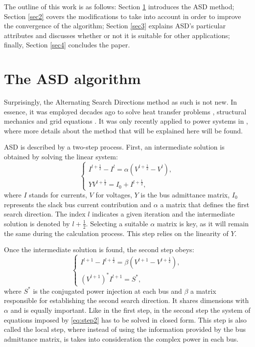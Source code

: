 \documentclass[journal]{IEEEtran}
\begin{document}
The outline of this work is as follows: Section \ref{sec1} introduces the ASD method; Section \ref{sec2} covers the modifications to take into account in order to improve the convergence of the algorithm; Section \ref{sec3} explains ASD's particular attributes and discusses whether or not it is suitable for other applications; finally, Section \ref{sec4} concludes the paper.


\section{The ASD algorithm} \label{sec1}
Surprisingly, the Alternating Search Directions method as such is not new. In essence, it was employed decades ago to solve heat transfer problems \cite{Rimek}, structural mechanics \cite{ladeveze} and grid equations \cite{samarskii}. It was only recently applied to power systems in \cite{asd}, where more details about the method that will be explained here will be found. 

ASD is described by a two-step process. First, an intermediate solution is obtained by solving the linear system:
\begin{equation}
  \begin{cases}
    I^{l+\frac{1}{2}} - I^l = \alpha(V^{l+\frac{1}{2}} - V^l),\\
    YV^{l + \frac{1}{2}} = I_0 + I^{l+\frac{1}{2}},
  \end{cases}
  \label{eq:step1}
\end{equation}
where $I$ stands for currents, $V$ for voltages, $Y$ is the bus admittance matrix, $I_0$ represents the slack bus current contribution and $\alpha$ a matrix that defines the first search direction. The index $l$ indicates a given iteration and the intermediate solution is denoted by $l+\frac{1}{2}$. Selecting a suitable $\alpha$ matrix is key, as it will remain the same during the calculation process. This step relies on the linearity of $Y$. 

Once the intermediate solution is found, the second step obeys:
\begin{equation}
  \begin{cases}
    I^{l+1} - I^{l+\frac{1}{2}} = \beta(V^{l+1} - V^{l+\frac{1}{2}}),\\
    (V^{l+1})^*I^{l+1}=S^*,
  \end{cases}
  \label{eq:step2}
\end{equation}
where $S^*$ is the conjugated power injection at each bus and $\beta$ a matrix responsible for establishing the second search direction. It shares dimensions with $\alpha$ and is equally important. Like in the first step, in the second step the system of equations imposed by \eqref{eq:step2} has to be solved in closed form. This step is also called the local step, where instead of using the information provided by the bus admittance matrix, is takes into consideration the complex power in each bus.
\end{document}
